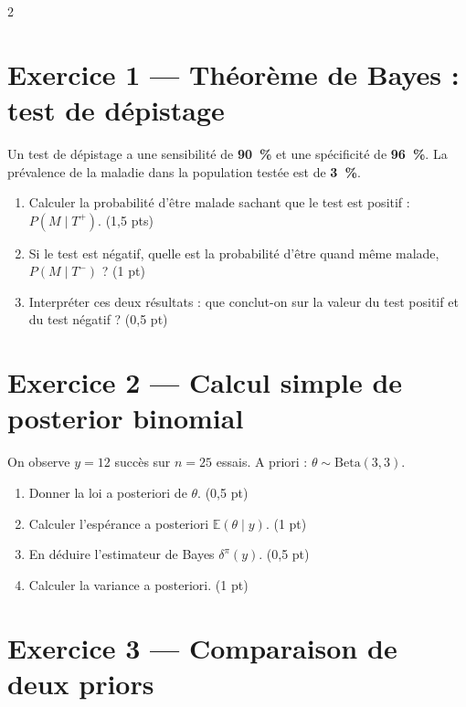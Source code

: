 \documentclass[9pt]{extarticle}
\begin{document}
\begin{multicols}{2}
\small
\section*{Exercice 1 --- Théorème de Bayes : test de dépistage}

Un test de dépistage a une sensibilité de \textbf{90~\%} et une spécificité de \textbf{96~\%}. La prévalence de la maladie dans la population testée est de \textbf{3~\%}.

\begin{enumerate}[label=\alph*)]
  \item Calculer la probabilité d'être malade sachant que le test est positif : $P(M \mid T^+)$. \hfill (1,5 pts)
  \item Si le test est négatif, quelle est la probabilité d'être quand même malade, $P(M \mid T^-)$ ? \hfill (1 pt)
  \item Interpréter ces deux résultats : que conclut-on sur la valeur du test positif et du test négatif ? \hfill (0,5 pt)
\end{enumerate}

\section*{Exercice 2 --- Calcul simple de posterior binomial}

On observe $y = 12$ succès sur $n = 25$ essais. A priori : $\theta \sim \mathrm{Beta}(3, 3)$.

\begin{enumerate}[label=\alph*)]
  \item Donner la loi a posteriori de $\theta$. \hfill (0,5 pt)
  \item Calculer l'espérance a posteriori $\mathbb{E}(\theta \mid y)$. \hfill (1 pt)
  \item En déduire l'estimateur de Bayes $\delta^\pi(y)$. \hfill (0,5 pt)
  \item Calculer la variance a posteriori. \hfill (1 pt)
\end{enumerate}

\section*{Exercice 3 --- Comparaison de deux priors}


\end{multicols}
\end{document}
